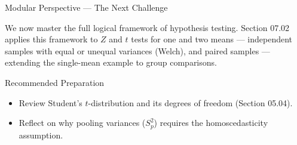\documentclass[10pt, aspectratio=169]{beamer}
\begin{document}
\begin{frame}{Modular Perspective --- The Next Challenge}
  \scriptsize
  \begin{retoclase}
    We now master the full logical framework of hypothesis testing. Section 07.02 applies this framework to $Z$ and $t$ tests for one and two means --- independent samples with equal or unequal variances (Welch), and paired samples --- extending the single-mean example to group comparisons.
  \end{retoclase}

  \vspace{0.08cm}
  \pause
  \begin{alertblock}{Recommended Preparation}
    \begin{itemize}\itemsep=0.06cm
      \item Review Student's $t$-distribution and its degrees of freedom (Section 05.04).
      \item Reflect on why pooling variances ($S_p^2$) requires the homoscedasticity assumption.
    \end{itemize}
  \end{alertblock}
\end{frame}
\end{document}
